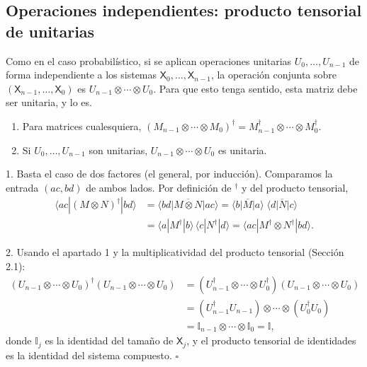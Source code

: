 \documentclass[11pt, a4paper, twoside, openright]{report}
\begin{document}
\subsection{Operaciones independientes: producto tensorial de unitarias}

\noindent Como en el caso probabilístico, si se aplican operaciones unitarias $U_0,\dots,U_{n-1}$ de forma independiente a los sistemas $\mathsf{X}_0,\dots,\mathsf{X}_{n-1}$, la operación conjunta sobre $(\mathsf{X}_{n-1},\dots,\mathsf{X}_0)$ es $U_{n-1}\otimes\cdots\otimes U_0$. Para que esto tenga sentido, esta matriz debe ser unitaria, y lo es.

\begin{tcolorbox}[colback=teal!5!white,colframe=teal!75!black,title=\textbf{Proposición: Producto tensorial y transpuesta conjugada}]
\begin{enumerate}
    \item Para matrices cualesquiera, $(M_{n-1}\otimes\cdots\otimes M_0)^\dagger = M_{n-1}^\dagger\otimes\cdots\otimes M_0^\dagger$.
    \item Si $U_0,\dots,U_{n-1}$ son unitarias, $U_{n-1}\otimes\cdots\otimes U_0$ es unitaria.
\end{enumerate}
\end{tcolorbox}

\begin{tcolorbox}[colback=gray!5!white,colframe=gray!75!black,title=\textbf{Demostración}]
1. Basta el caso de dos factores (el general, por inducción). Comparamos la entrada $(ac, bd)$ de ambos lados. Por definición de $^\dagger$ y del producto tensorial,
\begin{align*} \langle ac|(M\otimes N)^\dagger|bd\rangle &= \overline{\langle bd|M\otimes N|ac\rangle} = \overline{\langle b|M|a\rangle}\;\overline{\langle d|N|c\rangle} \\ &= \langle a|M^\dagger|b\rangle\,\langle c|N^\dagger|d\rangle = \langle ac|M^\dagger\otimes N^\dagger|bd\rangle. \end{align*}

2. Usando el apartado 1 y la multiplicatividad del producto tensorial (Sección 2.1):
\begin{align*}
(U_{n-1}\otimes\cdots\otimes U_0)^\dagger(U_{n-1}\otimes\cdots\otimes U_0)
&= (U_{n-1}^\dagger\otimes\cdots\otimes U_0^\dagger)(U_{n-1}\otimes\cdots\otimes U_0) \\
&= (U_{n-1}^\dagger U_{n-1})\otimes\cdots\otimes(U_0^\dagger U_0) \\ &= \mathbb{I}_{n-1}\otimes\cdots\otimes\mathbb{I}_0 = \mathbb{I},
\end{align*}
donde $\mathbb{I}_j$ es la identidad del tamaño de $\mathsf{X}_j$, y el producto tensorial de identidades es la identidad del sistema compuesto. \hfill $\square$
\end{tcolorbox}
\end{document}
